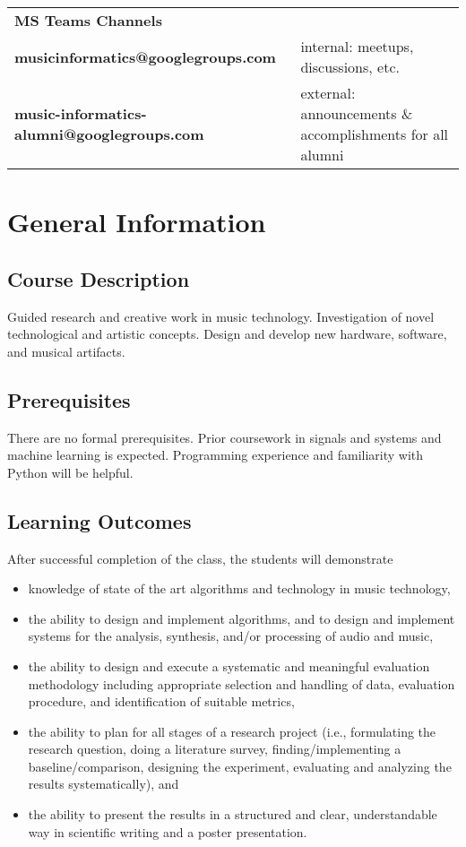 \documentclass[letterpaper,oneside,10pt]{scrartcl}
\begin{document}
    \vspace{\baselineskip}
    \begin{tabular}{ll}
        \textbf{MS Teams Channels} & \\
        \textbf{musicinformatics@googlegroups.com} & internal: meetups, discussions, etc.  \\
        \textbf{music-informatics-alumni@googlegroups.com} & external: announcements \& accomplishments for all alumni  \\
    \end{tabular}
        
\section{General Information}        
    \subsection{Course Description}
        Guided research and creative work in music technology. Investigation of novel technological and artistic concepts. Design and develop new hardware, software, and musical artifacts.
        
    \subsection{Prerequisites}
        There are no formal prerequisites. Prior coursework in signals and systems and machine learning is expected. Programming experience and familiarity with Python will be helpful.

    \subsection{Learning Outcomes}
        After successful completion of the class, the students will demonstrate 
        \begin{itemize}
            \item   knowledge of state of the art algorithms and technology in music technology,
            \item   the ability to design and implement algorithms, and to design and implement systems for the analysis, synthesis, and/or processing of audio and music,
            \item   the ability to design and execute a systematic and meaningful evaluation methodology including appropriate selection and handling of data, evaluation procedure, and identification of suitable metrics,
            \item   the ability to plan for all stages of a research project (i.e., formulating the research question, doing a literature survey, finding/implementing a baseline/comparison, designing the experiment, evaluating and analyzing the results systematically), and 
            \item   the ability to present the results in a structured and clear, understandable way in scientific writing and a poster presentation.
        \end{itemize}
        
\end{document}
